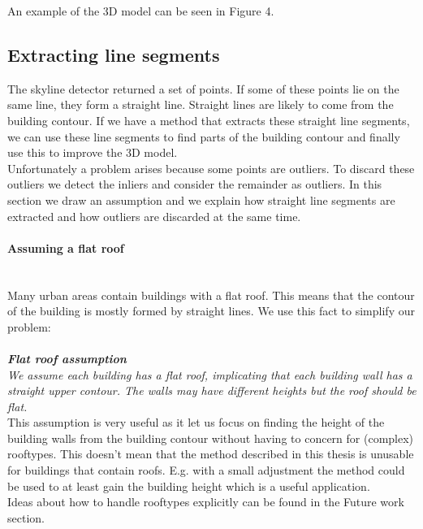 An example of the 3D model can be seen in Figure 4.

\subsection{Extracting line segments}
	The skyline detector returned a set of points. If some of these points lie
	on the same line, they form a straight line.  Straight lines are likely to
	come from the building contour. If we have a method that extracts these
	straight line segments, we can use these line segments to find parts of the
	building contour and finally use this to improve the 3D model.\\
	Unfortunately a problem arises because some points are outliers. To discard these outliers
	we detect the inliers and consider the remainder as outliers.  In this
	section we draw an assumption and we explain how straight line segments are extracted and how
	outliers are discarded at the same time.\\


	\paragraph{Assuming a flat roof}\\
	Many urban areas contain buildings with a flat roof. This means that the
	contour of the building is mostly formed by straight lines.  We use this
	fact to simplify our problem:\\\\
	\textbf{\emph{Flat roof assumption}}\\
	\emph{We assume each building has a flat roof, implicating that each building wall
	has a straight upper contour. The walls may have different heights but the roof should be flat.}\\

	This assumption is very useful as it let us focus on finding the height
	of the building walls from the building contour without having to concern
	for (complex) rooftypes.  This doesn't mean that the method described in
		this thesis is unusable for buildings that contain roofs. E.g.
		with a small adjustment the method could be used to at least
		gain the building height which is a useful application.\\
	Ideas about how to handle rooftypes explicitly can be found in the
	Future work section.\\

